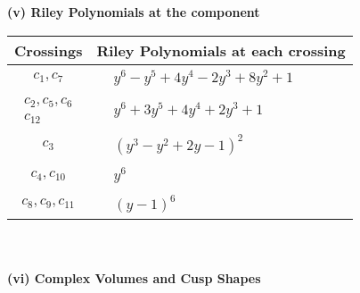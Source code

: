 \documentclass[1p]{elsarticle_modified}
\theoremstyle{definition}
\begin{document}
\newpage\renewcommand{\arraystretch}{1}
\flushleft \textbf{(v) Riley Polynomials at the component}\newline \\
\begin{tabular}{m{50pt}|m{274pt}}
Crossings & \hspace{64pt}Riley Polynomials at each crossing \\
\hline $$\begin{aligned}c_{1},c_{7}\end{aligned}$$&$\begin{aligned}
&y^6- y^5+4 y^4-2 y^3+8 y^2+1
\end{aligned}$\\
\hline $$\begin{aligned}c_{2},c_{5},c_{6}\\c_{12}\end{aligned}$$&$\begin{aligned}
&y^6+3 y^5+4 y^4+2 y^3+1
\end{aligned}$\\
\hline $$\begin{aligned}c_{3}\end{aligned}$$&$\begin{aligned}
&(y^3- y^2+2 y-1)^2
\end{aligned}$\\
\hline $$\begin{aligned}c_{4},c_{10}\end{aligned}$$&$\begin{aligned}
&y^6
\end{aligned}$\\
\hline $$\begin{aligned}c_{8},c_{9},c_{11}\end{aligned}$$&$\begin{aligned}
&(y-1)^6
\end{aligned}$\\
\hline
\end{tabular}\\~\\
\newpage\flushleft \textbf{(vi) Complex Volumes and Cusp Shapes}
\end{document}
